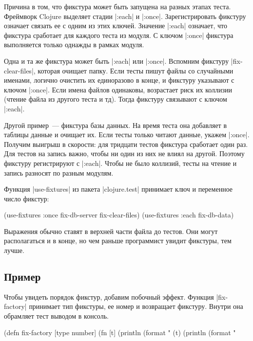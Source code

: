 Причина в том, что фикстура может быть запущена на разных этапах
теста. Фреймворк Clojure выделяет стадии \spverb|:each| и
\spverb|:once|. Зарегистрировать фикстуру означает связать ее с одним из этих
ключей. Значение \spverb|:each| означает, что фикстура сработает для каждого
теста из модуля. С ключом \spverb|:once| фикстура выполняется только однажды в
рамках модуля.

Одна и та же фикстура может быть \spverb|:each| или \spverb|:once|. Вспомним
фикстуру \spverb|fix-clear-files|, которая очищает папку. Если тесты пишут файлы
со случайными именами, логично очистить их единоразово в конце, и фикстуру
указывают с ключом \spverb|:once|. Если имена файлов одинаковы, возрастает риск
их коллизии (чтение файла из другого теста и тд). Тогда фикстуру связывают с
ключом \spverb|:each|.

Другой пример~--- фикстура базы данных. На время теста она добавляет в таблицы
данные и очищает их. Если тесты только читают данные, укажем
\spverb|:once|. Получим выигрыш в скорости: для тридцати тестов фикстура
сработает один раз. Для тестов на запись важно, чтобы ни один из них не влиял на
другой. Поэтому фикстуру регистрируют с \spverb|:each|. Чтобы не было коллизий,
тесты на чтение и запись разносят по разным модулям.

Функция \spverb|use-fixtures| из пакета \spverb|clojure.test| принимает ключ и
переменное число фикстур:

\begin{english}
  \begin{clojure}
(use-fixtures :once fix-db-server fix-clear-files)
(use-fixtures :each fix-db-data)
  \end{clojure}
\end{english}

Выражения обычно ставят в верхней части файла до тестов. Они могут располагаться
и в конце, но чем раньше программист увидит фикстуры, тем лучше.

\subsection{Пример}

Чтобы увидеть порядок фикстур, добавим побочный эффект. Функция
\spverb|fix-factory| принимает тип фикстуры, ее номер и возвращает
фикстуру. Внутри она обрамляет тест выводом в консоль.

\begin{english}
  \begin{clojure}
(defn fix-factory [type number]
  (fn [t]
    (println (format "%
    (t)
    (println (format "%
  \end{clojure}
\end{english}

